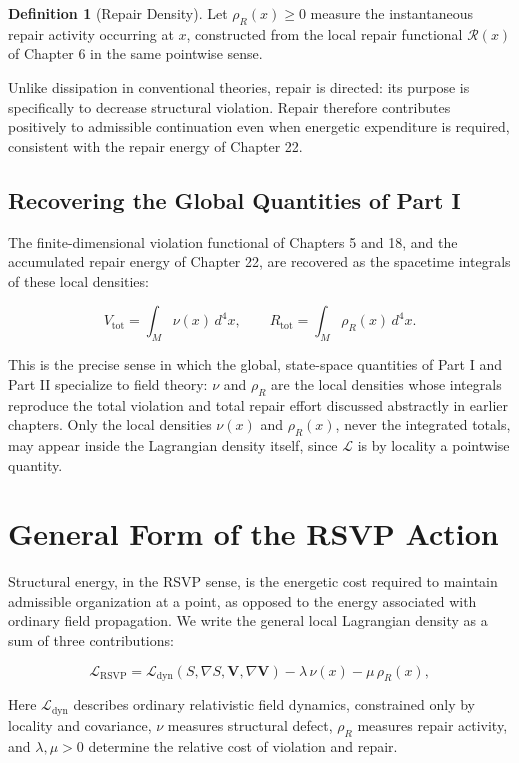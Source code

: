 \documentclass[11pt,oneside]{book}
\numberwithin{equation}{chapter}
\theoremstyle{definition}
\newtheorem{definition}{Definition}[chapter]
\theoremstyle{plain}
\begin{document}
\begin{definition}[Repair Density]
Let \(\rho_R(x)\ge 0\) measure the instantaneous repair activity occurring
at \(x\), constructed from the local repair functional \(\mathcal R(x)\) of
Chapter 6 in the same pointwise sense.
\end{definition}

Unlike dissipation in conventional theories, repair is directed: its purpose
is specifically to decrease structural violation. Repair therefore
contributes positively to admissible continuation even when energetic
expenditure is required, consistent with the repair energy of Chapter 22.

\subsection*{Recovering the Global Quantities of Part I}

The finite-dimensional violation functional of Chapters 5 and 18, and the
accumulated repair energy of Chapter 22, are recovered as the spacetime
integrals of these local densities:

\[
\boxed{
V_{\mathrm{tot}}
=
\int_M \nu(x)\,d^4x,
\qquad
R_{\mathrm{tot}}
=
\int_M \rho_R(x)\,d^4x.
}
\]

This is the precise sense in which the global, state-space quantities of
Part I and Part II specialize to field theory: \(\nu\) and \(\rho_R\) are
the local densities whose integrals reproduce the total violation and total
repair effort discussed abstractly in earlier chapters. Only the local
densities \(\nu(x)\) and \(\rho_R(x)\), never the integrated totals, may
appear inside the Lagrangian density itself, since \(\mathcal L\) is by
locality a pointwise quantity.

\section{General Form of the RSVP Action}

Structural energy, in the RSVP sense, is the energetic cost required to
maintain admissible organization at a point, as opposed to the energy
associated with ordinary field propagation. We write the general local
Lagrangian density as a sum of three contributions:

\[
\boxed{
\mathcal L_{\mathrm{RSVP}}
=
\mathcal L_{\mathrm{dyn}}
\left(S,\nabla S,\mathbf V,\nabla\mathbf V\right)
-
\lambda\,\nu(x)
-
\mu\,\rho_R(x),
}
\]

Here \(\mathcal L_{\mathrm{dyn}}\) describes ordinary relativistic field dynamics, constrained only by locality and covariance, \(\nu\) measures structural defect, \(\rho_R\) measures repair activity, and \(\lambda,\mu>0\) determine the relative cost of violation and repair.
\end{document}
